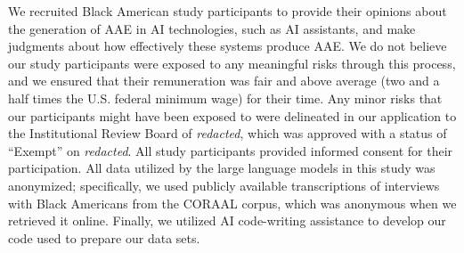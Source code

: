 We recruited Black American study participants to provide their opinions about the generation of AAE in AI technologies, such as AI assistants, and make judgments about how effectively these systems produce AAE. We do not believe our study participants were exposed to any meaningful risks through this process, and we ensured that their remuneration was fair and above average (two and a half times the U.S. federal minimum wage) for their time. Any minor risks that our participants might have been exposed to were delineated in our application to the Institutional Review Board of \emph{redacted}, which was approved with a status of ``Exempt'' on \emph{redacted}. All study participants provided informed consent for their participation. All data utilized by the large language models in this study was anonymized; specifically, we used publicly available transcriptions of interviews with Black Americans from the CORAAL corpus, which was anonymous when we retrieved it online. Finally, we utilized AI code-writing assistance to develop our code used to prepare our data sets.
